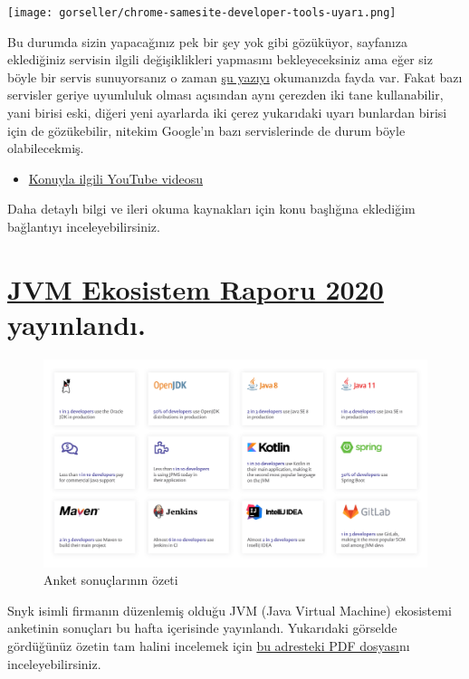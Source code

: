 \documentclass[11pt]{article}
\begin{document}
\begin{center}
\texttt{[image: gorseller/chrome-samesite-developer-tools-uyarı.png]}
\end{center}

Bu durumda sizin yapacağınız pek bir şey yok gibi gözüküyor, sayfanıza
eklediğiniz servisin ilgili değişiklikleri yapmasını bekleyeceksiniz ama eğer
siz böyle bir servis sunuyorsanız o zaman \href{https://web.dev/samesite-cookies-explained/}{şu yazıyı} okumanızda fayda var.
Fakat bazı servisler geriye uyumluluk olması açısından aynı çerezden iki tane
kullanabilir, yani birisi eski, diğeri yeni ayarlarda iki çerez yukarıdaki
uyarı bunlardan birisi için de gözükebilir, nitekim Google'ın bazı
servislerinde de durum böyle olabilecekmiş.

\begin{itemize}
\item \href{https://www.youtube.com/watch?v=GPz7onXjP\_4}{Konuyla ilgili YouTube videosu}
\end{itemize}

Daha detaylı bilgi ve ileri okuma kaynakları için konu başlığına eklediğim
bağlantıyı inceleyebilirsiniz.
\section{\href{https://snyk.io/blog/jvm-ecosystem-report-2020/}{JVM Ekosistem Raporu 2020} yayınlandı.}
\label{sec:org6406743}
\begin{figure}[htbp]
\centering
\includegraphics[width=.9\linewidth]{gorseller/jvm-ekosistem-2020-ozet.png}
\caption{Anket sonuçlarının özeti}
\end{figure}

Snyk isimli firmanın düzenlemiş olduğu JVM (Java Virtual Machine) ekosistemi
anketinin sonuçları bu hafta içerisinde yayınlandı. Yukarıdaki görselde
gördüğünüz özetin tam halini incelemek için \href{https://snyk.io/wp-content/uploads/jvm\_2020.pdf}{bu adresteki PDF dosyası}nı
inceleyebilirsiniz.
\end{document}
